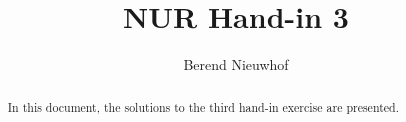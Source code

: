 \documentclass[a4paper,10pt]{article}
\title{NUR Hand-in 3}
\author{Berend Nieuwhof}
\begin{document}
\maketitle

\begin{abstract}
    In this document, the solutions to the third hand-in exercise are presented. 
\end{abstract}


\end{document}
